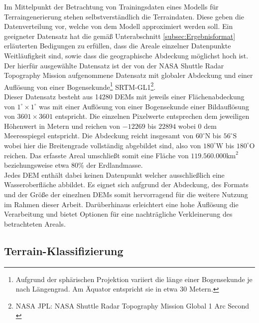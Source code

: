 Im Mittelpunkt der Betrachtung von Trainingsdaten eines Modells für Terraingenerierung stehen selbstverständlich die Terraindaten. Diese geben die Datenverteilung vor, welche von dem Modell approximiert werden soll. Ein geeigneter Datensatz hat die gemäß Unterabschnitt \ref{subsec:Ergebnisformat} erläuterten Bedigungen zu erfüllen, dass die Areale einzelner Datenpunkte Weitläufigkeit sind, sowie dass die geographische Abdeckung möglichst hoch ist. \\
Der hierfür ausgewählte Datensatz ist der von der NASA Shuttle Radar Topography Mission aufgenommene Datensatz mit globaler Abdeckung und einer Auflösung von einer Bogensekunde\footnote{
    Aufgrund der sphärischen Projektion variiert die länge einer Bogensekunde je nach Längengrad. Am Äquator entspricht sie in etwa 30 Metern.
} SRTM-GL1\footnote{
    NASA JPL: NASA Shuttle Radar Topography Mission Global 1 Arc Second
    \cite{nasa2013srtm}
}. \\
Dieser Datensatz besteht aus 14280 DEMs mit jeweils einer Flächenabdeckung von $1^{\circ}\times1^{\circ}$ was mit einer Auflösung von einer Bogensekunde einer Bildauflösung von $3601\times3601$ entspricht. Die einzelnen Pixelwerte entsprechen dem jeweiligen Höhenwert in Metern und reichen von $-12269$ bis $22894$ wobei $0$ dem Meeresspiegel entspricht. Die Abdeckung reicht insgesamt von $60^{\circ}\text{N}$ bis $56^{\circ}\text{S}$ wobei hier die Breitengrade vollständig abgebildet sind, also von $180^{\circ}\text{W}$ bis $180^{\circ}\text{O}$ reichen. Das erfasste Areal umschließt somit eine Fläche von $119.560.000\text{km}^2$ beziehungsweise etwa $80\%$ der Erdlandmasse.\\
Jedes DEM enthält dabei keinen Datenpunkt welcher ausschließlich eine Wasseroberfläche abbildet. Es eignet sich aufgrund der Abdeckung, des Formats und der Größe der einezlnen DEMs somit hervorragend für die weitere Nutzung im Rahmen dieser Arbeit. Darüberhinaus erleichtert eine hohe Äuflösung die Verarbeitung und bietet Optionen für eine nachträgliche Verkleinerung des betrachteten Areals.

\subsection{Terrain-Klassifizierung}

